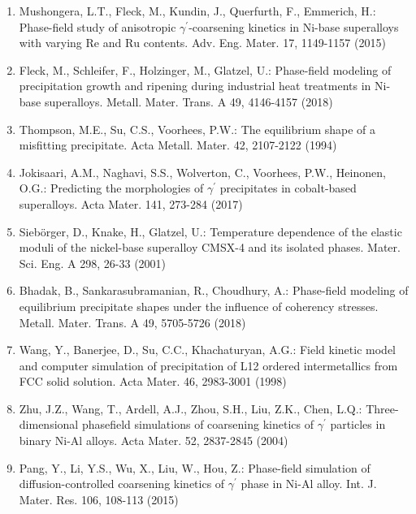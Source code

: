 \documentclass[10pt]{article}
\begin{document}
\begin{enumerate}
  \item Mushongera, L.T., Fleck, M., Kundin, J., Querfurth, F., Emmerich, H.: Phase-field study of anisotropic $\gamma^{\prime}$-coarsening kinetics in Ni-base superalloys with varying $\mathrm{Re}$ and $\mathrm{Ru}$ contents. Adv. Eng. Mater. 17, 1149-1157 (2015)

  \item Fleck, M., Schleifer, F., Holzinger, M., Glatzel, U.: Phase-field modeling of precipitation growth and ripening during industrial heat treatments in Ni-base superalloys. Metall. Mater. Trans. A 49, 4146-4157 (2018)

  \item Thompson, M.E., Su, C.S., Voorhees, P.W.: The equilibrium shape of a misfitting precipitate. Acta Metall. Mater. 42, 2107-2122 (1994)

  \item Jokisaari, A.M., Naghavi, S.S., Wolverton, C., Voorhees, P.W., Heinonen, O.G.: Predicting the morphologies of $\gamma^{\prime}$ precipitates in cobalt-based superalloys. Acta Mater. 141, 273-284 (2017)

  \item Siebörger, D., Knake, H., Glatzel, U.: Temperature dependence of the elastic moduli of the nickel-base superalloy CMSX-4 and its isolated phases. Mater. Sci. Eng. A 298, 26-33 (2001)

  \item Bhadak, B., Sankarasubramanian, R., Choudhury, A.: Phase-field modeling of equilibrium precipitate shapes under the influence of coherency stresses. Metall. Mater. Trans. A 49, 5705-5726 (2018)

  \item Wang, Y., Banerjee, D., Su, C.C., Khachaturyan, A.G.: Field kinetic model and computer simulation of precipitation of L12 ordered intermetallics from FCC solid solution. Acta Mater. 46, 2983-3001 (1998)

  \item Zhu, J.Z., Wang, T., Ardell, A.J., Zhou, S.H., Liu, Z.K., Chen, L.Q.: Three-dimensional phasefield simulations of coarsening kinetics of $\gamma^{\prime}$ particles in binary Ni-Al alloys. Acta Mater. 52, 2837-2845 (2004)

  \item Pang, Y., Li, Y.S., Wu, X., Liu, W., Hou, Z.: Phase-field simulation of diffusion-controlled coarsening kinetics of $\gamma^{\prime}$ phase in Ni-Al alloy. Int. J. Mater. Res. 106, 108-113 (2015)


\end{enumerate}
\end{document}
